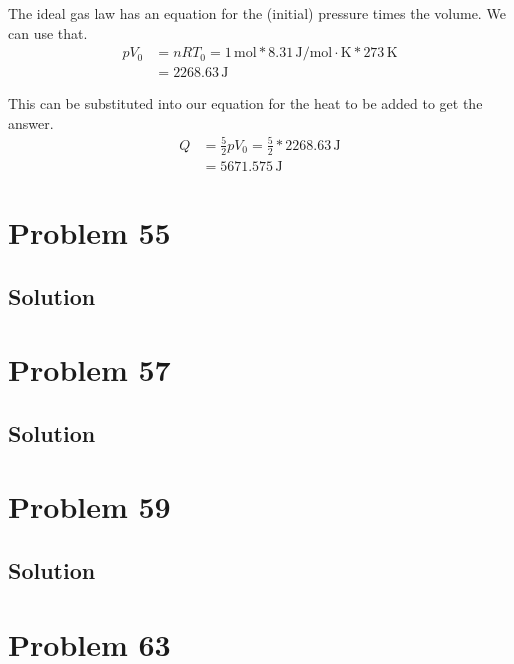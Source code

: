 \documentclass[12pt]{article}
\begin{document}
            The ideal gas law has an equation for the (initial) pressure times the volume. 
            We can use that.
            \begin{align}
                pV_0    &=  nRT_0
                    =   1\,\unit{\mole} * 8.31\,\unit{\joule/\mole\cdot\kelvin} * 273\,\unit{\kelvin}\\
                    &=  2268.63\,\unit{\joule}
            \end{align}

            This can be substituted into our equation for the heat to be added to get the answer.
            \begin{align}
                Q   &=  \frac{5}{2} pV_0
                    =   \frac{5}{2} * 2268.63\,\unit{\joule}\\
                    &=  \boxed{5671.575\,\unit{\joule}}
            \end{align}

    \pagebreak
    \section{Problem 55}

        \subsection{Solution}

    \pagebreak
    \section{Problem 57}

        \subsection{Solution}

    \pagebreak
    \section{Problem 59}

        \subsection{Solution}

    \pagebreak
    \section{Problem 63}
\end{document}
